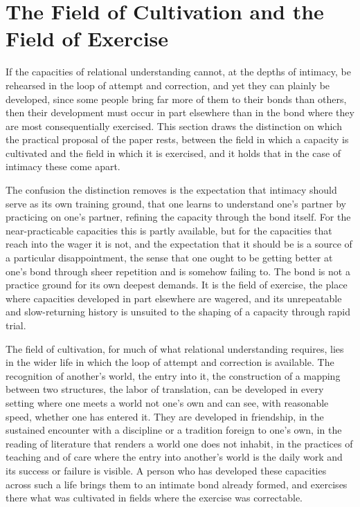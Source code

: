 \section{The Field of Cultivation and the Field of Exercise}
\label{p27:sec:fields}

\noindent
If the capacities of relational understanding cannot, at the depths of intimacy, be rehearsed in the loop of attempt and correction, and yet they can plainly be developed, since some people bring far more of them to their bonds than others, then their development must occur in part elsewhere than in the bond where they are most consequentially exercised. This section draws the distinction on which the practical proposal of the paper rests, between the field in which a capacity is cultivated and the field in which it is exercised, and it holds that in the case of intimacy these come apart.

The confusion the distinction removes is the expectation that intimacy should serve as its own training ground, that one learns to understand one's partner by practicing on one's partner, refining the capacity through the bond itself. For the near-practicable capacities this is partly available, but for the capacities that reach into the wager it is not, and the expectation that it should be is a source of a particular disappointment, the sense that one ought to be getting better at one's bond through sheer repetition and is somehow failing to. The bond is not a practice ground for its own deepest demands. It is the field of exercise, the place where capacities developed in part elsewhere are wagered, and its unrepeatable and slow-returning history is unsuited to the shaping of a capacity through rapid trial.

The field of cultivation, for much of what relational understanding requires, lies in the wider life in which the loop of attempt and correction is available. The recognition of another's world, the entry into it, the construction of a mapping between two structures, the labor of translation, can be developed in every setting where one meets a world not one's own and can see, with reasonable speed, whether one has entered it. They are developed in friendship, in the sustained encounter with a discipline or a tradition foreign to one's own, in the reading of literature that renders a world one does not inhabit, in the practices of teaching and of care where the entry into another's world is the daily work and its success or failure is visible. A person who has developed these capacities across such a life brings them to an intimate bond already formed, and exercises there what was cultivated in fields where the exercise was correctable.

